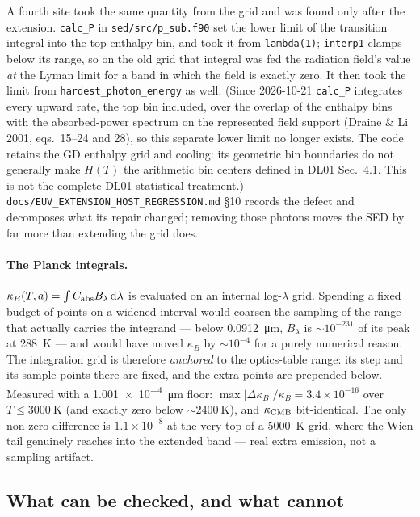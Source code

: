 \documentclass{my_memo}
\begin{document}
\medskip
\noindent A fourth site took the same quantity from the grid and was
found only after the extension. \texttt{calc\_P} in
\texttt{sed/src/p\_sub.f90} set the lower limit of the transition
integral into the top enthalpy bin, and took it from
\texttt{lambda(1)}; \texttt{interp1} clamps below its range, so on the
old grid that integral was fed the radiation field's value \emph{at}
the Lyman limit for a band in which the field is exactly zero. It then
took the limit from \texttt{hardest\_photon\_energy} as well. (Since
2026-10-21 \texttt{calc\_P} integrates every upward rate, the top bin
included, over the overlap of the enthalpy bins with the absorbed-power
spectrum on the represented field support (Draine \& Li 2001,
eqs.~15--24 and 28), so this separate lower limit no longer exists.
The code retains the GD enthalpy grid and cooling: its geometric bin
boundaries do not generally make $H(T)$ the arithmetic bin centers defined
in DL01 Sec.~4.1. This is not the complete DL01 statistical treatment.)
\texttt{docs/EUV\_EXTENSION\_HOST\_REGRESSION.md} \S10 records the
defect and decomposes what its repair changed; removing those photons
moves the SED by far more than extending the grid does.

\paragraph{The Planck integrals.} $\kappa_B(T,a) = \int
C_{\rm abs}B_\lambda\,{\rm d}\lambda$ is evaluated on an internal
log-$\lambda$ grid. Spending a fixed budget of points on a widened
interval would coarsen the sampling of the range that actually carries
the integrand --- below \SI{0.0912}{\micro\meter}, $B_\lambda$ is
$\sim10^{-231}$ of its peak at \SI{288}{\kelvin} --- and would have
moved $\kappa_B$ by $\sim10^{-4}$ for a purely numerical reason. The
integration grid is therefore \emph{anchored} to the optics-table
range: its step and its sample points there are fixed, and the extra
points are prepended below. Measured with a
\SI{1.001e-4}{\micro\meter} floor: $\max|\Delta\kappa_B|/\kappa_B =
3.4\times10^{-16}$ over $T\le\SI{3000}{\kelvin}$ (and exactly zero
below $\sim\SI{2400}{\kelvin}$), and $\kappa_{\rm CMB}$ bit-identical.
The only non-zero difference is $1.1\times10^{-8}$ at the very top of a
\SI{5000}{\kelvin} grid, where the Wien tail genuinely reaches into the
extended band --- real extra emission, not a sampling artifact.

\subsection{What can be checked, and what cannot}
\label{sec:euv-refs}
\end{document}

